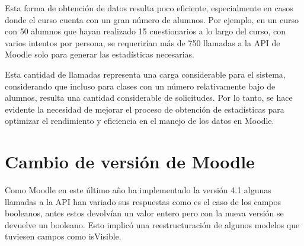 Esta forma de obtención de datos resulta poco eficiente, especialmente en casos donde el curso cuenta con un gran número de alumnos. Por ejemplo, en un curso con 50 alumnos que hayan realizado 15 cuestionarios a lo largo del curso, con varios intentos por persona, se requerirían más de 750 llamadas a la API de Moodle solo para generar las estadísticas necesarias.

Esta cantidad de llamadas representa una carga considerable para el sistema, considerando que incluso para clases con un número relativamente bajo de alumnos, resulta una cantidad considerable de solicitudes. Por lo tanto, se hace evidente la necesidad de mejorar el proceso de obtención de estadísticas para optimizar el rendimiento y eficiencia en el manejo de los datos en Moodle.

\section{Cambio de versión de Moodle}
Como Moodle en este último año ha implementado la versión 4.1 algunas llamadas a la API han variado sus respuestas como es el caso de los campos booleanos, antes estos devolvían un valor entero pero con la nueva versión se devuelve un booleano. Esto implicó una reestructuración de algunos modelos que tuviesen campos como isVisible.